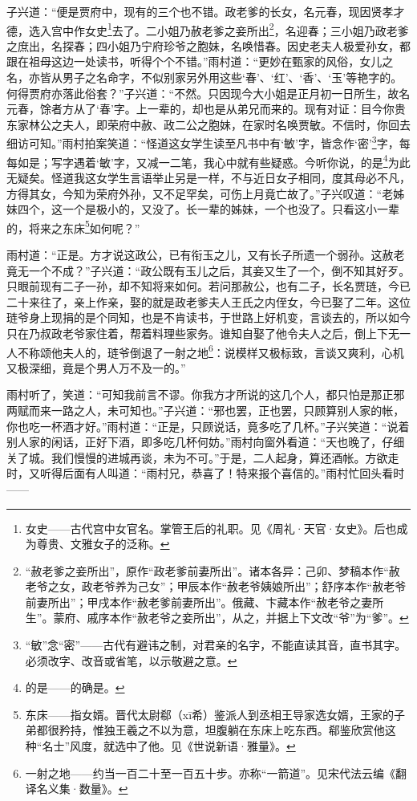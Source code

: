 \par 子兴道：“便是贾府中，现有的三个也不错。政老爹的长女，名元春，现因贤孝才德，选入宫中作女史\footnote{女史——古代宫中女官名。掌管王后的礼职。见《周礼·天官·女史》。后也成为尊贵、文雅女子的泛称。}去了。二小姐乃赦老爹之妾所出\footnote{“赦老爹之妾所出”，原作“政老爹前妻所出”。诸本各异：己卯、梦稿本作“赦老爷之女，政老爷养为己女”；甲辰本作“赦老爷姨娘所出”；舒序本作“赦老爷前妻所出”；甲戌本作“赦老爹前妻所出”。俄藏、卞藏本作“赦老爷之妻所生”。蒙府、戚序本作“赦老爷之妾所出”，从之，并据上下文改“爷”为“爹”。}，名迎春；三小姐乃政老爹之庶出，名探春；四小姐乃宁府珍爷之胞妹，名唤惜春。因史老夫人极爱孙女，都跟在祖母这边一处读书，听得个个不错。”雨村道：“更妙在甄家的风俗，女儿之名，亦皆从男子之名命字，不似别家另外用这些‘春’、‘红’、‘香’、‘玉’等艳字的。何得贾府亦落此俗套？”子兴道：“不然。只因现今大小姐是正月初一日所生，故名元春，馀者方从了‘春’字。上一辈的，却也是从弟兄而来的。现有对证：目今你贵东家林公之夫人，即荣府中赦、政二公之胞妹，在家时名唤贾敏。不信时，你回去细访可知。”雨村拍案笑道：“怪道这女学生读至凡书中有‘敏’字，皆念作‘密’\footnote{“敏”念“密”——古代有避讳之制，对君亲的名字，不能直读其音，直书其字。必须改字、改音或省笔，以示敬避之意。}字，每每如是；写字遇着‘敏’字，又减一二笔，我心中就有些疑惑。今听你说，的是\footnote{的是——的确是。}为此无疑矣。怪道我这女学生言语举止另是一样，不与近日女子相同，度其母必不凡，方得其女，今知为荣府外孙，又不足罕矣，可伤上月竟亡故了。”子兴叹道：“老姊妹四个，这一个是极小的，又没了。长一辈的姊妹，一个也没了。只看这小一辈的，将来之东床\footnote{东床——指女婿。晋代太尉郗（xī希）鉴派人到丞相王导家选女婿，王家的子弟都很矜持，惟独王羲之不以为意，坦腹躺在东床上吃东西。郗鉴欣赏他这种“名士”风度，就选中了他。见《世说新语·雅量》。}如何呢？”
\par 雨村道：“正是。方才说这政公，已有衔玉之儿，又有长子所遗一个弱孙。这赦老竟无一个不成？”子兴道：“政公既有玉儿之后，其妾又生了一个，倒不知其好歹。只眼前现有二子一孙，却不知将来如何。若问那赦公，也有二子，长名贾琏，今已二十来往了，亲上作亲，娶的就是政老爹夫人王氏之内侄女，今已娶了二年。这位琏爷身上现捐的是个同知，也是不肯读书，于世路上好机变，言谈去的，所以如今只在乃叔政老爷家住着，帮着料理些家务。谁知自娶了他令夫人之后，倒上下无一人不称颂他夫人的，琏爷倒退了一射之地\footnote{一射之地——约当一百二十至一百五十步。亦称“一箭道”。见宋代法云编《翻译名义集·数量》。}：说模样又极标致，言谈又爽利，心机又极深细，竟是个男人万不及一的。”
\par 雨村听了，笑道：“可知我前言不谬。你我方才所说的这几个人，都只怕是那正邪两赋而来一路之人，未可知也。”子兴道：“邪也罢，正也罢，只顾算别人家的帐，你也吃一杯酒才好。”雨村道：“正是，只顾说话，竟多吃了几杯。”子兴笑道：“说着别人家的闲话，正好下酒，即多吃几杯何妨。”雨村向窗外看道：“天也晚了，仔细关了城。我们慢慢的进城再谈，未为不可。”于是，二人起身，算还酒帐。方欲走时，又听得后面有人叫道：“雨村兄，恭喜了！特来报个喜信的。”雨村忙回头看时——



